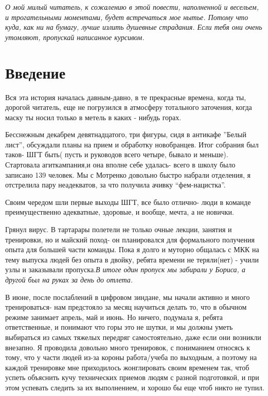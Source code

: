 \documentclass[]{article}
\begin{document}
	
\textit{О мой милый читатель, к сожалению в этой повести, наполненной и весельем, и трогательными моментами, будет встречаться мое нытье. Потому что куда, как ни на бумагу, лучше излить душевные страдания. Если тебя они очень утомляют, пропускай написанное курсивом.   
}	


\section{Введение}


Вся эта история началась давным-давно, в те прекрасные времена, когда ты, дорогой читатель, еще не погрузился в атмосферу тотального заточения, когда маску ты носил только в метель в каких - нибудь горах.

Бесснежным декабрем девятнадцатого, три фигуры, сидя в антикафе ”Белый лист”, обсуждали планы на прием и обработку новобранцев. Итог собрания был таков- ШГТ быть( пусть и руководов всего четыре, бывало и меньше). Стартовала агиткампания,и она вполне себе удалась- всего в школу было записано 139 человек. Мы с Мотренко довольно быстро набрали отделения, я отстрелила пару неадекватов, за что получила ачивку “фем-нацистка”.

Своим чередом шли первые выходы ШГТ, все было отлично- люди в команде преимущественно адекватные, здоровые, и вообще, мечта, а не новички. 

Грянул вирус. В тартарары полетели не только очные лекции, занятия и тренировки, но и майский поход- он планировался для формального получения опыта для большей части команды. Пока я долго и муторно общалась с МКК на тему выпуска людей без опыта в двойку, ребята времени не теряли(нет) - учили узлы и заказывали пропуска.\textit{В итоге один пропуск мы забирали у Бориса, а другой был на руках за день до отлета.}  

В июне, после послаблений в  цифровом зиндане, мы начали активно и много тренироваться- нам предстояло за месяц научиться делать то, что в обычном режиме занимает апрель, май и июнь. Но ничего, подумала я, ребята ответственные, и понимают что горы это не шутки, и мы должны уметь выбираться из самых тяжелых передряг самостоятельно, даже если они возникли внезапно. Я проводила довольно много тренировок, с пониманием относясь к тому, что у части людей из-за короны работа/учеба по выходным, а поэтому на каждой тренировке мне приходилось жонглировать своим временем так, чтоб успеть объяснить кучу технических приемов людям с разной подготовкой, и при этом успевать следить за их выполнением, и хорошо бы еще чтоб никто не тупил. 
\end{document}
